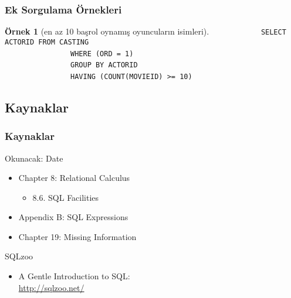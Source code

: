\documentclass[dvipsnames]{beamer}
\theoremstyle{definition}
\theoremstyle{example}
\newtheorem{ornek}[theorem]{Örnek}
\theoremstyle{plain}
\begin{document}
\begin{frame}[fragile]
  \frametitle{Ek Sorgulama Örnekleri}

  \begin{ornek}[en az 10 başrol oynamış oyuncuların isimleri]
~~~~~~~~~~~~\lstinline!SELECT ACTORID FROM CASTING!\\
~~~~~~~~~~~~~~~~\lstinline!WHERE (ORD = 1)!\\
\pause
~~~~~~~~~~~~~~~~\lstinline!GROUP BY ACTORID!\\
\pause
~~~~~~~~~~~~~~~~\lstinline!HAVING (COUNT(MOVIEID) >= 10)!\\
  \end{ornek}
\end{frame}

\subsection*{Kaynaklar}

\begin{frame}
  \frametitle{Kaynaklar}

  \begin{block}{Okunacak: Date}
    \begin{itemize}
      \item Chapter 8: Relational Calculus
      \begin{itemize}
        \item 8.6. \alert{SQL Facilities}
      \end{itemize}
      \item Appendix B: \alert{SQL Expressions}
      \item Chapter 19: Missing Information
    \end{itemize}
  \end{block}

  \begin{block}{SQLzoo}
    \begin{itemize}
      \item A Gentle Introduction to SQL:\\
	\url{http://sqlzoo.net/}
    \end{itemize}
  \end{block}
\end{frame}
\end{document}
